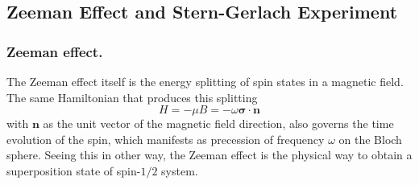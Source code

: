 \documentclass[../../../main.tex]{subfiles}
\begin{document}
\subsection{Zeeman Effect and Stern-Gerlach Experiment}

\subsubsection{Zeeman effect.}
The Zeeman effect itself is the energy splitting of spin states in a magnetic field.
The same Hamiltonian that produces this splitting
\begin{equation*}
  H = -\mu B = -\omega \boldsymbol{\sigma} \cdot \boldsymbol{n}
\end{equation*}
with $\mathbf{n}$ as the unit vector of the magnetic field direction, also governs the time evolution of the spin, which manifests as precession of frequency $\omega$ on the Bloch sphere.
Seeing this in other way, the Zeeman effect is the physical way to obtain a superposition state of spin-$1/2$ system.
\end{document}
